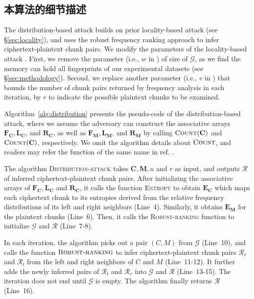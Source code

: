 \subsection{本算法的细节描述}
 The distribution-based attack builds on prior locality-based attack \cite{li17} (see \S\ref{sec:locality}), and uses the robust frequency ranking approach to infer ciphertext-plaintext chunk pairs. We modify the parameters of the locality-based attack \cite{li17}. First, we remove the parameter (i.e., $w$ in \cite{li17}) of size of $\mathcal{G}$, as we find the memory can hold all fingerprints of our experimental datasets (see \S\ref{sec:methodology}). Second, we replace another parameter (i.e., $v$ in \cite{li17}) that bounds the number of chunk pairs returned by frequency analysis in each iteration, by $r$ to indicate the possible plaintext chunks to be examined.     

 Algorithm~\ref{alg:distribution} presents the pseudo-code of the distribution-based attack, where we assume the adversary can construct the associative arrays $\mathbf{F_C}, \mathbf{L_C}$, and $\mathbf{R_C}$, as well as $\mathbf{F_M}, \mathbf{L_M}$, and $\mathbf{R_M}$ by calling $\textsc{Count}(\mathbf{C})$ and $\textsc{Count}(\mathbf{C})$, respectively. We omit the algorithm details about $\textsc{Count}$, and readers may refer the function of the same name in ref. \cite{li17}. 

 The algorithm \textsc{Distribution-attack} takes $\mathbf{C}, \mathbf{M}, u$ and $r$ as input, and outputs $\mathcal{R}$ of inferred ciphertext-plaintext chunk pairs. After initializing the associative arrays of $\mathbf{F_C}, \mathbf{L_C}$ and $\mathbf{R_C}$, it calls the function \textsc{Entropy} to obtain $\mathbf{E_C}$ which maps each ciphertext chunk to its entropies derived from the relative frequency distributions of its left and right neighbors (Line~4). Similarly, it obtains $\mathbf{E_M}$ for the plaintext chunks (Line~6). Then, it calls the \textsc{Robust-ranking} function to initialize $\mathcal{G}$ and $\mathcal{R}$ (Line~7-8). 

 In each iteration, the algorithm picks out a pair $(C, M)$ from $\mathcal{G}$ (Line~10), and calls the function $\textsc{Robust-ranking}$ to infer ciphertext-plaintext chunk pairs $\mathcal{R}_r$ and $\mathcal{R}_l$ from the left and right neighbors of $C$ and $M$ (Line~11-12). It further adds the newly inferred pairs of $\mathcal{R}_l$ and $\mathcal{R}_r$ into $\mathcal{G}$ and $\mathcal{R}$ (Line~13-15). The iteration does not end until $\mathcal{G}$ is empty. The algorithm finally returns $\mathcal{R}$ (Line~16).    


